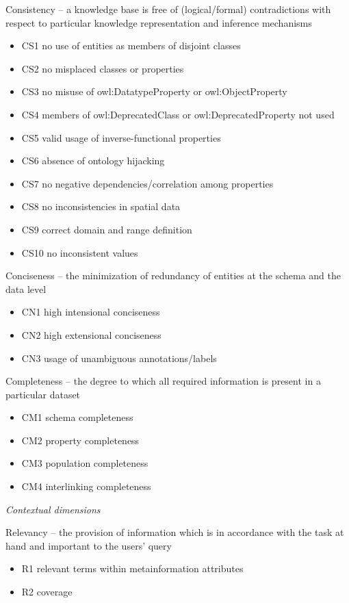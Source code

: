 Consistency -- a knowledge base is free of (logical/formal) contradictions with respect to particular knowledge representation and inference mechanisms
\begin{itemize}
 \setlength{\parskip}{0pt}
 \setlength{\itemsep}{0pt plus 1pt}
 \item CS1 no use of entities as members of disjoint classes
 \item CS2 no misplaced classes or properties
 \item CS3 no misuse of owl:DatatypeProperty or owl:ObjectProperty
 \item CS4 members of owl:DeprecatedClass or owl:DeprecatedProperty not used
 \item CS5 valid usage of inverse-functional properties
 \item CS6 absence of ontology hijacking
 \item CS7 no negative dependencies/correlation among properties
 \item CS8 no inconsistencies in spatial data
 \item CS9 correct domain and range definition
 \item CS10 no inconsistent values
\end{itemize}

Conciseness -- the minimization of redundancy of entities at the schema and the data level
\begin{itemize}
 \setlength{\parskip}{0pt}
 \setlength{\itemsep}{0pt plus 1pt}
 \item CN1 high intensional conciseness
 \item CN2 high extensional conciseness
 \item CN3 usage of unambiguous annotations/labels
\end{itemize}

Completeness -- the degree to which all required information is present in a particular dataset
\begin{itemize}
 \setlength{\parskip}{0pt}
 \setlength{\itemsep}{0pt plus 1pt}
 \item CM1 schema completeness
 \item CM2 property completeness
 \item CM3 population completeness
 \item CM4 interlinking completeness
\end{itemize}

\emph{Contextual dimensions}

Relevancy -- the provision of information which is in accordance with the task at hand and important to the users’ query
\begin{itemize}
 \setlength{\parskip}{0pt}
 \setlength{\itemsep}{0pt plus 1pt}
 \item R1 relevant terms within metainformation attributes
 \item R2 coverage
\end{itemize}

